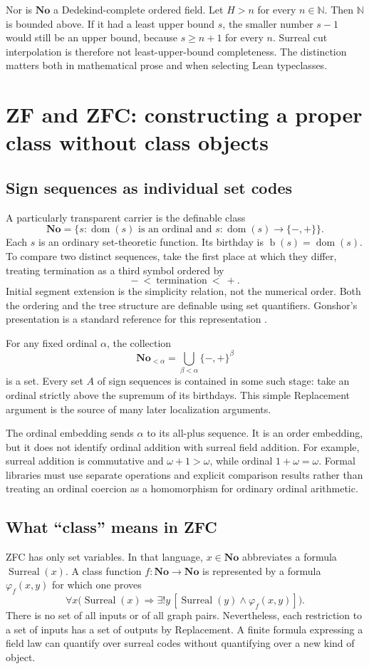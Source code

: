 \documentclass[11pt,letterpaper]{article}
\numberwithin{equation}{section}
\theoremstyle{definition}
\theoremstyle{remark}
\newcommand{\No}{\mathbf{No}}
\newcommand{\N}{\mathbb{N}}
\newcommand{\bd}{\operatorname{b}}
\begin{document}
Nor is $\No$ a Dedekind-complete ordered field. Let $H>n$ for every $n\in\N$. Then $\N$ is bounded above. If it had a least upper bound $s$, the smaller number $s-1$ would still be an upper bound, because $s\ge n+1$ for every $n$. Surreal cut interpolation is therefore not least-upper-bound completeness. The distinction matters both in mathematical prose and when selecting Lean typeclasses.

\section{ZF and ZFC: constructing a proper class without class objects}\label{sec:zfc}
\subsection{Sign sequences as individual set codes}
A particularly transparent carrier is the definable class
\begin{equation}\label{eq:signclass}
 \No=\{s:\operatorname{dom}(s)\text{ is an ordinal and }s:\operatorname{dom}(s)\to\{-,+\}\}.
\end{equation}
Each $s$ is an ordinary set-theoretic function. Its birthday is $\bd(s)=\operatorname{dom}(s)$. To compare two distinct sequences, take the first place at which they differ, treating termination as a third symbol ordered by
\[
 -\ <\ \text{termination}\ <\ +.
\]
Initial segment extension is the simplicity relation, not the numerical order. Both the ordering and the tree structure are definable using set quantifiers. Gonshor's presentation is a standard reference for this representation \cite{Gonshor}.

For any fixed ordinal $\alpha$, the collection
\[
 \No_{<\alpha}=\bigcup_{\beta<\alpha}\{-,+\}^{\beta}
\]
is a set. Every set $A$ of sign sequences is contained in some such stage: take an ordinal strictly above the supremum of its birthdays. This simple Replacement argument is the source of many later localization arguments.

The ordinal embedding sends $\alpha$ to its all-plus sequence. It is an order embedding, but it does not identify ordinal addition with surreal field addition. For example, surreal addition is commutative and $\omega+1>\omega$, while ordinal $1+\omega=\omega$. Formal libraries must use separate operations and explicit comparison results rather than treating an ordinal coercion as a homomorphism for ordinary ordinal arithmetic.

\subsection{What ``class'' means in ZFC}
ZFC has only set variables. In that language, $x\in\No$ abbreviates a formula $\operatorname{Surreal}(x)$. A class function $f:\No\to\No$ is represented by a formula $\varphi_f(x,y)$ for which one proves
\[
 \forall x\bigl(\operatorname{Surreal}(x)\Rightarrow
   \exists!y\,[\operatorname{Surreal}(y)\land\varphi_f(x,y)]\bigr).
\]
There is no set of all inputs or of all graph pairs. Nevertheless, each restriction to a set of inputs has a set of outputs by Replacement. A finite formula expressing a field law can quantify over surreal codes without quantifying over a new kind of object.
\end{document}
